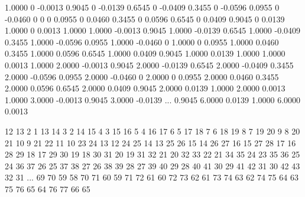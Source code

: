 \begin{minipage}[]{0.48\textwidth}
 \begin{inputfile}[frame=single, caption={\opt{rr.dat} created by \opt{wing.m}}, label={file:wing_rr}]
    1.0000         0   -0.0013
    0.9045         0   -0.0139
    0.6545         0   -0.0409
    0.3455         0   -0.0596
    0.0955         0   -0.0460
         0         0         0
    0.0955         0    0.0460
    0.3455         0    0.0596
    0.6545         0    0.0409
    0.9045         0    0.0139
    1.0000         0    0.0013
    1.0000    1.0000   -0.0013
    0.9045    1.0000   -0.0139
    0.6545    1.0000   -0.0409
    0.3455    1.0000   -0.0596
    0.0955    1.0000   -0.0460
         0    1.0000         0
    0.0955    1.0000    0.0460
    0.3455    1.0000    0.0596
    0.6545    1.0000    0.0409
    0.9045    1.0000    0.0139
    1.0000    1.0000    0.0013
    1.0000    2.0000   -0.0013
    0.9045    2.0000   -0.0139
    0.6545    2.0000   -0.0409
    0.3455    2.0000   -0.0596
    0.0955    2.0000   -0.0460
         0    2.0000         0
    0.0955    2.0000    0.0460
    0.3455    2.0000    0.0596
    0.6545    2.0000    0.0409
    0.9045    2.0000    0.0139
    1.0000    2.0000    0.0013
    1.0000    3.0000   -0.0013
    0.9045    3.0000   -0.0139
   ...
    0.9045    6.0000    0.0139
    1.0000    6.0000    0.0013
 \end{inputfile}
\end{minipage} \hspace{10pt}
\begin{minipage}[]{0.48\textwidth}
 \begin{inputfile}[frame=single, caption={\opt{ee.dat} file created by \opt{wing.m}}, label={file:wing_ee}]
    12    13     2     1
    13    14     3     2
    14    15     4     3
    15    16     5     4
    16    17     6     5
    17    18     7     6
    18    19     8     7
    19    20     9     8
    20    21    10     9
    21    22    11    10
    23    24    13    12
    24    25    14    13
    25    26    15    14
    26    27    16    15
    27    28    17    16
    28    29    18    17
    29    30    19    18
    30    31    20    19
    31    32    21    20
    32    33    22    21
    34    35    24    23
    35    36    25    24
    36    37    26    25
    37    38    27    26
    38    39    28    27
    39    40    29    28
    40    41    30    29
    41    42    31    30
    42    43    32    31
   ...
    69    70    59    58
    70    71    60    59
    71    72    61    60
    72    73    62    61
    73    74    63    62
    74    75    64    63
    75    76    65    64
    76    77    66    65
 \end{inputfile}
\end{minipage}

